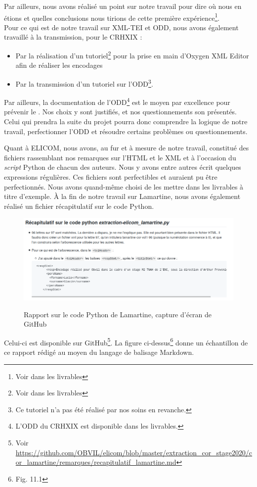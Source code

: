 Par ailleurs, nous avons réalisé un point sur notre travail pour dire où nous en étions et quelles conclusions nous tirions de cette première expérience\footnote{Voir dans les livrables }.\\

Pour ce qui est de notre travail sur XML-TEI et ODD, nous avons également travaillé à la transmission, pour le CRHXIX : 
\begin{itemize}
    \item Par la réalisation d'un tutoriel\footnote{Voir dans les livrables } pour la prise en main d'Oxygen XML Editor afin de réaliser les encodages
    \item Par la transmission d'un tutoriel sur l'ODD\footnote{Ce tutoriel n'a pas été réalisé par nos soins en revanche.}.
\end{itemize}
Par ailleurs, la documentation de l'ODD\footnote{L'ODD du CRHXIX est disponible dans les livrables.} est le moyen par excellence pour prévenir le . Nos choix y sont justifiés, et nos questionnements son présentés. Celui qui prendra la suite du projet pourra donc comprendre la logique de notre travail, perfectionner l'ODD et résoudre certains problèmes ou questionnements.

Quant à ELICOM, nous avons, au fur et à mesure de notre travail, constitué des fichiers rassemblant nos remarques sur l'HTML et le XML et à l'occasion du \emph{script} Python de chacun des auteurs. Nous y avons entre autres écrit quelques expressions régulières. Ces fichiers sont perfectibles et auraient pu être perfectionnés. Nous avons quand-même choisi de les mettre dans les livrables à titre d'exemple. À la fin de notre travail sur Lamartine, nous avons également réalisé un fichier récapitulatif sur le code Python.\begin{figure}[ht]
    \centering
    \caption{Rapport sur le code Python de Lamartine, capture d'écran de GitHub}
    \includegraphics[width=16cm]{images/recapLamartine.png}
    \label{recapLamartine}
\end{figure}
Celui-ci est disponible sur GitHub\footnote{Voir \url{https://github.com/OBVIL/elicom/blob/master/extraction_cor_stage2020/cor_lamartine/remarques/recapitulatif_lamartine.md}}. La figure ci-dessus\footnote{Fig. 11.1} donne un échantillon de ce rapport rédigé au moyen du langage de balisage Markdown.\\


